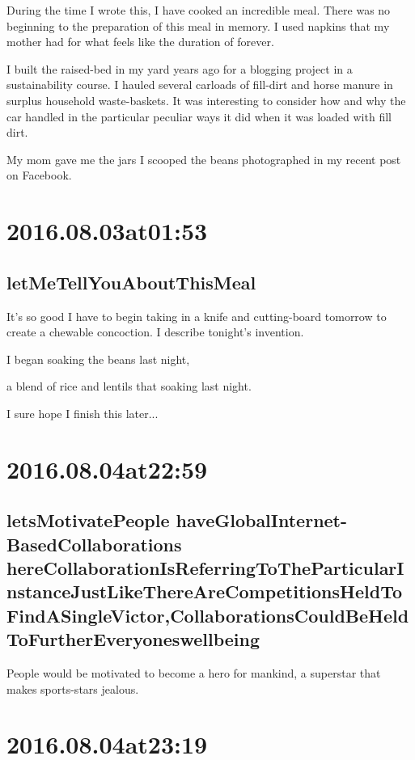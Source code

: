 \begin{enumerate}
\begin{enumerate}
During the time I wrote this, I have cooked an incredible meal. There was no beginning to the preparation of this meal in memory. I used napkins that my mother had for what feels like the duration of forever.

I built the raised-bed in my yard years ago for a blogging project in a sustainability course. I hauled several carloads of fill-dirt and horse manure in surplus household waste-baskets. It was interesting to consider how and why the car handled in the particular peculiar ways it did when it was loaded with fill dirt.

My mom gave me the jars I scooped the beans photographed in my recent post on Facebook.

\section*{ 2016.08.03at01:53 }
\subsection*{ letMeTellYouAboutThisMeal }
It's so good I have to begin taking in a knife and cutting-board tomorrow to create a chewable concoction. I describe tonight's invention.
\begin{itemized}
\item I began soaking the beans last night,
\item a blend of rice and lentils that soaking last night.
\item I sure hope I finish this later...
\end{itemized}

\section*{ 2016.08.04at22:59 }
\subsection*{ letsMotivatePeople haveGlobalInternet-BasedCollaborations hereCollaborationIsReferringToTheParticularInstanceJustLikeThereAreCompetitionsHeldToFindASingleVictor,CollaborationsCouldBeHeldToFurtherEveryoneswellbeing }
People would be motivated to become a hero for mankind, a superstar that makes sports-stars jealous.

\section*{ 2016.08.04at23:19 }

\end{enumerate}
\end{enumerate}
